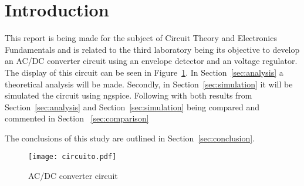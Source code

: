 \section{Introduction}
\label{sec:introduction}


\hspace{0,5cm} This report is being made for the subject of Circuit Theory and Electronics Fundamentals and is related to the third laboratory being its objective to develop an AC/DC converter circuit using an envelope detector and an voltage regulator. The display of this circuit can be seen in Figure~\ref{fig:circuito}.
In Section~\ref{sec:analysis} a theoretical analysis will be made. Secondly, in Section~\ref{sec:simulation} it will be simulated the circuit using ngspice. Following with both results from Section~\ref{sec:analysis} and Section~\ref{sec:simulation} being compared and commented in Section ~\ref{sec:comparison}
\par The conclusions of this study are outlined in Section~\ref{sec:conclusion}.

\begin{figure}[H] \centering
\texttt{[image: circuito.pdf]}
\caption{AC/DC converter circuit}
\label{fig:circuito}
\end{figure}


